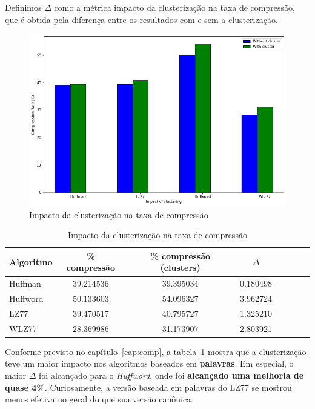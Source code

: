 Definimos $\Delta$ como a métrica impacto da clusterização na taxa de compressão, que é obtida pela diferença entre os resultados com e sem a clusterização.
 \begin{figure}[H]
   \centering
   \includegraphics[scale=0.60]{figs/graphfinal.png}
    \caption{Impacto da clusterização na taxa de compressão}
    \label{fig:clusterfinalgraph}
 \end{figure}
 
 \begin{table}[H]
   \centering
   \caption{Impacto da clusterização na taxa de compressão} \label{tab:resultcomp}
   \begin{tabular}{|l|c|c|c|c|c|c|r|}
        \hline
        \small{Algoritmo} & \small{\% compressão} &  \small{\% compressão (clusters)} & \small{$\Delta$} \\ \hline
              Huffman   &   39.214536 & 39.395034 & 0.180498 \\ \hline
              Huffword  &   50.133603 & 54.096327 & 3.962724 \\ \hline
              LZ77        &   39.470517 & 40.795727 & 1.325210 \\ \hline
              WLZ77    &   28.369986 & 31.173907 & 2.803921 \\ \hline
  \end{tabular}
\end{table}

Conforme previsto no capítulo~\ref{cap:comp}, a tabela~\ref{tab:resultcomp} mostra que a clusterização teve um maior impacto nos algoritmos baseados em \textbf{palavras}.
Em especial, o maior $\Delta$ foi alcançado para o \emph{Huffword}, onde foi \textbf{alcançado uma melhoria de quase 4\%}. Curiosamente, a versão baseada em palavras do LZ77 se mostrou menos efetiva no geral do que sua versão canônica.

